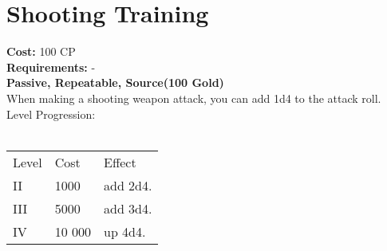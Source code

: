\section{Shooting Training}
\textbf{Cost:} 100 CP\\
\textbf{Requirements:} -\\
\textbf{Passive, Repeatable, Source(100 Gold)}\\
When making a shooting weapon attack, you can add 1d4 to the attack roll.
\\
Level Progression:\\
\\
\begin{tabular}{l | l | l}
	Level & Cost & Effect\\
	II & 1000 & add 2d4.\\
	III & 5000 & add 3d4.\\
	IV & 10 000 & up 4d4.\\
\end{tabular}